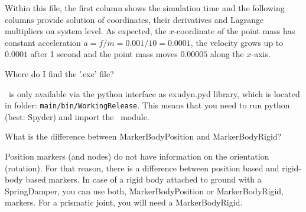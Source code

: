 Within this file, the first column shows the simulation time and the following columns provide solution of coordinates, their derivatives and Lagrange multipliers on system level. As expected, the $x$-coordinate of the point mass has constant acceleration $a=f/m=0.001/10=0.0001$, the velocity grows up to $0.0001$ after 1 second and the point mass moves $0.00005$ along the $x$-axis.
%

\bn
  \item Where do I find the '.exe' file?
	\bi
	\item[$\ra$] \codeName\ is only available via the python interface as exudyn.pyd library, which is located in folder: \texttt{main/bin/WorkingRelease}. This means that you need to run python (best: Spyder) and import the \codeName\ module.
	\ei
  \item What is the difference between MarkerBodyPosition and MarkerBodyRigid?
	\bi
	\item[$\ra$] Position markers (and nodes) do not have information on the orientation (rotation). For that reason, there is a difference between position based and rigid-body based markers. In case of a rigid body attached to ground with a SpringDamper, you can use both, MarkerBodyPosition or MarkerBodyRigid, markers. For a prismatic joint, you will need a MarkerBodyRigid.
	\ei
\en


